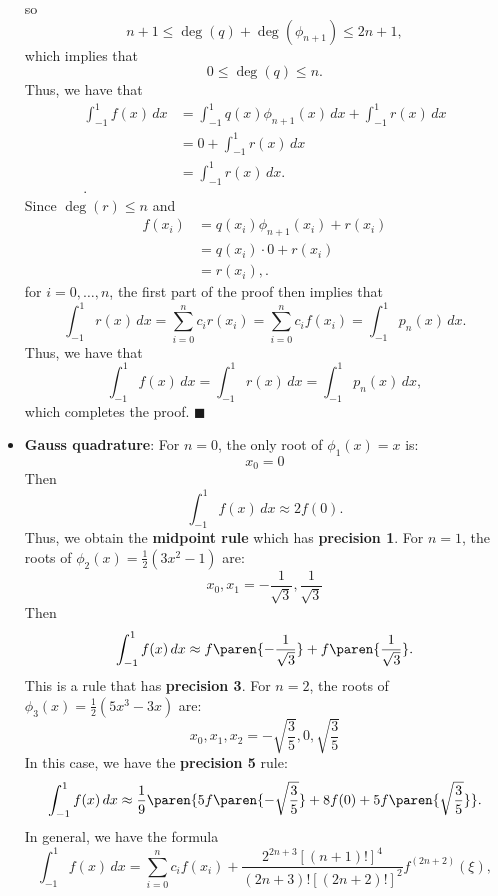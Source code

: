 \documentclass{report}
\begin{document}
\begin{itemize}
            so
            $$n+1 \leq \deg(q) + \deg(\phi_{n+1}) \leq 2n + 1,$$
            which implies that
            $$ 0 \leq \deg(q) \leq n.$$
            Thus, we have that
            \begin{align*}
                \int_{-1}^1 f(x)\,dx 
&= \int_{-1}^1 q(x) \phi_{n+1}(x)\, dx + \int_{-1}^1 r(x)\, dx \\
&= 0 + \int_{-1}^1 r(x)\, dx \\
&= \int_{-1}^1 r(x)\, dx. \\
            .\end{align*}
            \bigbreak \noindent 
            Since $\deg(r) \le n$ and
            \begin{align*}
                f(x_i) 
&= q(x_i) \phi_{n+1}(x_i) + r(x_i) \\
&= q(x_i) \cdot 0 + r(x_i) \\
&= r(x_i),
            .\end{align*}
            for $i = 0,\ldots, n$, the first part of the proof then implies that 
            $$\int_{-1}^1 r(x)\,dx = \sum_{i=0}^n c_i r(x_i) = \sum_{i=0}^n c_i f(x_i) = \int_{-1}^1 p_n(x)\,dx.$$
            Thus, we have that
            $$
            \int_{-1}^1 f(x)\,dx = \int_{-1}^1 r(x)\, dx = \int_{-1}^1 p_n(x)\, dx,
            $$
            which completes the proof. $\blacksquare$
        \item \textbf{ Gauss quadrature}:  For $n = 0$, the only root of $\phi_1(x) = x$ is:
            $$x_0 = 0$$
            Then
            $$ \int_{-1}^1 f(x) \,dx \approx 2 f(0). $$
            Thus, we obtain the \textbf{midpoint rule} which has \textbf{precision 1}.
            \bigbreak \noindent 
            For $n = 1$, the roots of $\phi_2(x) = \frac{1}{2}(3x^2 - 1)$ are:
            $$x_0, x_1 = -\frac{1}{\sqrt{3}}, \frac{1}{\sqrt{3}}$$
            Then
            $$ \int_{-1}^1 f(x)\, dx \approx f\paren{-\frac{1}{\sqrt{3}}} + f\paren{\frac{1}{\sqrt{3}}}.$$
            This is a rule that has \textbf{precision 3}.
            \bigbreak \noindent 
            For $n = 2$, the roots of $\phi_3(x) = \frac{1}{2}(5x^3 - 3x)$ are:
            $$x_0, x_1, x_2 = -\sqrt{\frac{3}{5}}, 0, \sqrt{\frac{3}{5}}$$
            In this case, we have the \textbf{precision 5} rule:
            $$ \int_{-1}^{1} f(x)\, dx \approx \frac{1}{9} \paren{5f\paren{-\sqrt{\frac{3}{5}}} + 8f(0) + 5f\paren{\sqrt{\frac{3}{5}}} }.$$
            \bigbreak \noindent 
            In general, we have the formula
            $$ \int_{-1}^1 f(x) \,dx = \sum_{i=0}^n c_i f(x_i) + \frac{2^{2n+3}[(n+1)!]^4}{(2n+3)![(2n+2)!]^2} f^{(2n+2)}(\xi), $$

\end{itemize}
\end{document}
